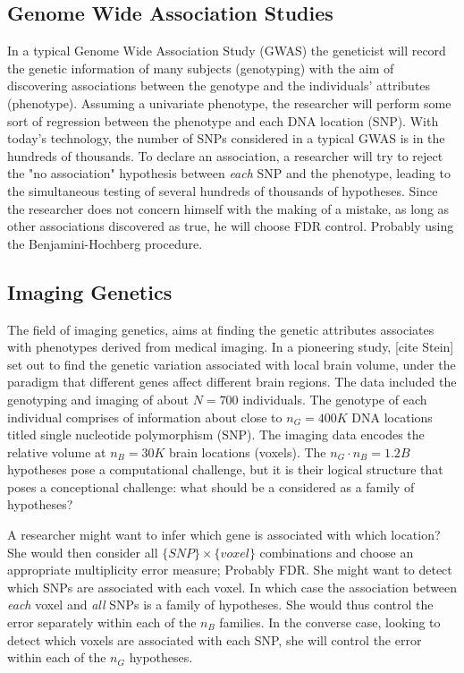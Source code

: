 \documentclass[draft,12pt]{article}
\begin{document}
\subsection{Genome Wide Association Studies}
In a typical Genome Wide Association Study (GWAS) the geneticist will record the genetic information of many subjects (genotyping) with the aim of discovering associations between the genotype and the individuals' attributes (phenotype). Assuming a univariate phenotype, the researcher will perform some sort of regression between the phenotype and each DNA location (SNP). With today’s technology, the number of SNPs considered in a typical GWAS is in the hundreds of thousands. To declare an association, a researcher will try to reject the "no association" hypothesis between \emph{each} SNP and the phenotype, leading to the simultaneous testing of several hundreds of thousands of hypotheses. Since the researcher does not concern himself with the making of a mistake, as long as other associations discovered as true, he will choose FDR control. Probably using the Benjamini-Hochberg procedure.




\subsection{\label{eg:imaging_genetics}Imaging Genetics}
The field of imaging genetics, aims at finding the genetic attributes associates with phenotypes derived from medical imaging. In a pioneering study, [cite Stein] set out to find the genetic variation associated with local brain volume, under the paradigm that different genes affect different brain regions. The data included the genotyping and imaging of about $N=700$ individuals. The genotype of each individual comprises of information about close to $n_G=400K$ DNA locations titled single nucleotide polymorphism (SNP). The imaging data encodes the relative volume at $n_B=30K$ brain locations (voxels). The $n_G \cdot n_B=1.2B$ hypotheses pose a computational challenge, but it is their logical structure that poses a conceptional challenge: what should be a considered as a family of hypotheses?

A researcher might want to infer which gene is associated with which location? She would then consider all $\{SNP\} \times \{voxel\}$ combinations and choose an appropriate multiplicity error measure; Probably FDR. 
She might want to detect which SNPs are associated with each voxel. In which case the association between \emph{each} voxel and \emph{all} SNPs is a family of hypotheses. She would thus control the error separately within each of the $n_B$ families. 
In the converse case, looking to detect which voxels are associated with each SNP, she will control the error within each of the $n_G$ hypotheses.
\end{document}
